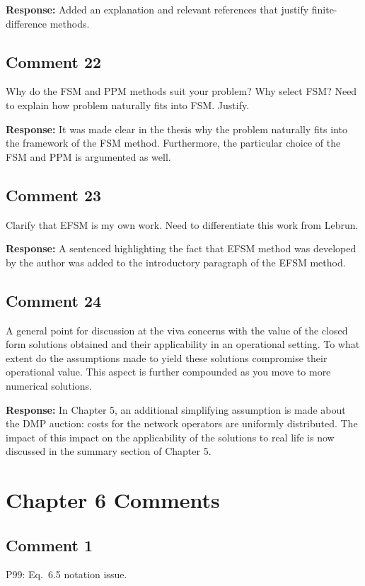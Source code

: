 \documentclass[10pt,a4paper,notitlepage]{article}
\numberwithin{equation}{section}
\begin{document}
\textbf{Response:}
Added an explanation and relevant references that justify finite-difference methods.

\subsection{Comment 22}
Why do the FSM and PPM methods suit your problem? Why select FSM? Need to explain how problem naturally fits into FSM. Justify.

\textbf{Response:}
It was made clear in the thesis why the problem naturally fits into the framework of the FSM method. Furthermore, the particular choice of the FSM and PPM is argumented as well.

\subsection{Comment 23}
Clarify that EFSM is my own work. Need to differentiate this work from Lebrun.

\textbf{Response:}
A sentenced highlighting the fact that EFSM method was developed by the author was added to the introductory paragraph of the EFSM method.

\subsection{Comment 24}
A general point for discussion at the viva concerns with the value of the closed form solutions obtained and their applicability in an operational setting. To what extent do the assumptions made to yield these solutions compromise their operational value. This aspect is further compounded as you move to more numerical solutions.

\textbf{Response:}
In Chapter 5, an additional simplifying assumption is made about the DMP auction: costs for the network operators are uniformly distributed. The impact of this impact on the applicability of the solutions to real life is now discussed in the summary section of Chapter 5.

\clearpage

\section{Chapter 6 Comments}
\subsection{Comment 1}
P99: Eq.~6.5 notation issue.
\end{document}
